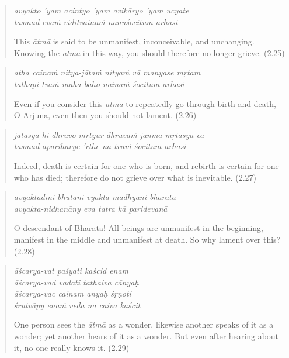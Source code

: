 \documentclass[12pt, twoside, openright]{memoir}
\begin{document}
\par
\begin{verse}
\textit{avyakto ’yam acintyo ’yam avikāryo ’yam ucyate} \\
\textit{tasmād evaṁ viditvainaṁ nānuśocitum arhasi}

\noindent This \textit{ātmā} is said to be unmanifest, inconceivable, and unchanging. Knowing the \textit{ātmā} in this way, you should therefore no longer grieve. (2.25)
\end{verse}
\par



\par
\begin{verse}
\textit{atha cainaṁ nitya-jātaṁ nityaṁ vā manyase mṛtam} \\
\textit{tathāpi tvaṁ mahā-bāho nainaṁ śocitum arhasi}

\noindent Even if you consider this \textit{ātmā} to repeatedly go through birth and death, O Arjuna, even then you should not lament. (2.26)
\end{verse}
\par



\par
\begin{verse}
\textit{jātasya hi dhruvo mṛtyur dhruvaṁ janma mṛtasya ca} \\
\textit{tasmād aparihārye ’rthe na tvaṁ śocitum arhasi}

\noindent Indeed, death is certain for one who is born, and rebirth is certain for one who has died; therefore do not grieve over what is inevitable. (2.27)
\end{verse}
\par



\par
\begin{verse}
\textit{avyaktādīni bhūtāni vyakta-madhyāni bhārata} \\
\textit{avyakta-nidhanāny eva tatra kā paridevanā}

\noindent O descendant of Bharata! All beings are unmanifest in the beginning, manifest in the middle and unmanifest at death. So why lament over this? (2.28)
\end{verse}
\par



\par
\begin{verse}
\textit{āścarya-vat paśyati kaścid enam} \\
\textit{āścarya-vad vadati tathaiva cānyaḥ} \\
\textit{āścarya-vac cainam anyaḥ śṛṇoti} \\
\textit{śrutvāpy enaṁ veda na caiva kaścit}

\noindent One person sees the \textit{ātmā} as a wonder, likewise another speaks of it as a wonder; yet another hears of it as a wonder. But even after hearing about it, no one really knows it. (2.29)
\end{verse}
\par
\end{document}
